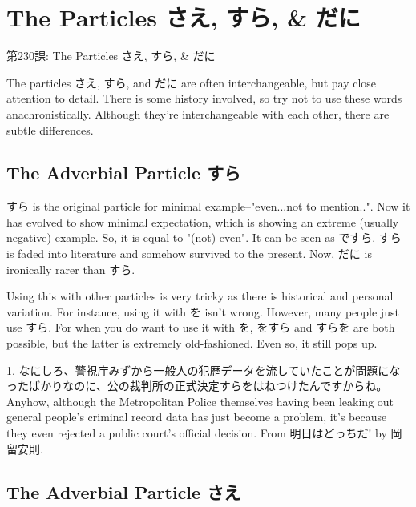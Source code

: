     
\chapter{The Particles さえ, すら, \& だに}

\begin{center}
\begin{Large}
第230課: The Particles さえ, すら, \& だに 
\end{Large}
\end{center}
 
\par{ The particles さえ, すら, and だに are often interchangeable, but pay close attention to detail. There is some history involved, so try not to use these words anachronistically. Although they're interchangeable with each other, there are subtle differences. }
      
\section{The Adverbial Particle すら}
 
\par{ すら is the original particle for minimal example--"even\dothyp{}\dothyp{}\dothyp{}not to mention..". Now it has evolved to show minimal expectation, which is showing an extreme (usually negative) example. So, it is equal to "(not) even". It can be seen as ですら. すら is faded into literature and somehow survived to the present. Now, だに is ironically rarer than すら. }

\par{ Using this with other particles is very tricky as there is historical and personal variation. For instance, using it with を isn't wrong. However, many people just use すら. For when you do want to use it with を, をすら and すらを are both possible, but the latter is extremely old-fashioned. Even so, it still pops up. }

\par{1. なにしろ、警視庁みずから一般人の犯歴データを流していたことが問題になったばかりなのに、公の裁判所の正式決定すらをはねつけたんですからね。 \hfill\break
Anyhow, although the Metropolitan Police themselves having been leaking out general people's criminal record data has just become a problem, it's because they even rejected a public court's official decision. \hfill\break
From 明日はどっちだ! by 岡留安則. }
      
\section{The Adverbial Particle さえ}
 
